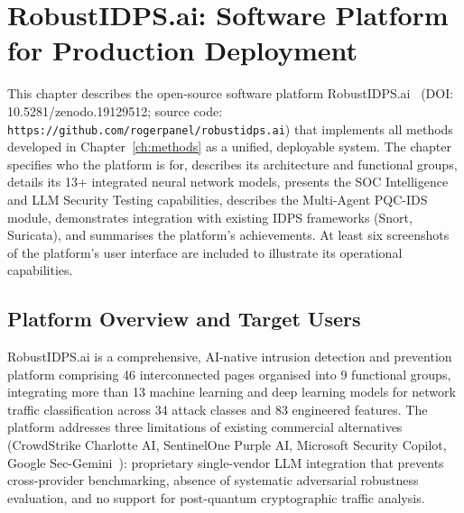 
\chapter{RobustIDPS.ai: Software Platform for Production Deployment}
\label{ch:platform}

This chapter describes the open-source software platform RobustIDPS.ai~\cite{Anaedevha2026robustidps} (DOI: 10.5281/zenodo.19129512; source code: \texttt{https://github.com/rogerpanel/robustidps.ai}) that implements all methods developed in Chapter~\ref{ch:methods} as a unified, deployable system. The chapter specifies who the platform is for, describes its architecture and functional groups, details its 13+ integrated neural network models, presents the SOC Intelligence and LLM Security Testing capabilities, describes the Multi-Agent PQC-IDS module, demonstrates integration with existing IDPS frameworks (Snort, Suricata), and summarises the platform's achievements. At least six screenshots of the platform's user interface are included to illustrate its operational capabilities.


\section{Platform Overview and Target Users}
\label{sec:platform_overview}

RobustIDPS.ai is a comprehensive, AI-native intrusion detection and prevention platform comprising 46 interconnected pages organised into 9 functional groups, integrating more than 13 machine learning and deep learning models for network traffic classification across 34 attack classes and 83 engineered features. The platform addresses three limitations of existing commercial alternatives (CrowdStrike Charlotte AI, SentinelOne Purple AI, Microsoft Security Copilot, Google Sec-Gemini~\cite{Smith2023}): proprietary single-vendor LLM integration that prevents cross-provider benchmarking, absence of systematic adversarial robustness evaluation, and no support for post-quantum cryptographic traffic analysis.

